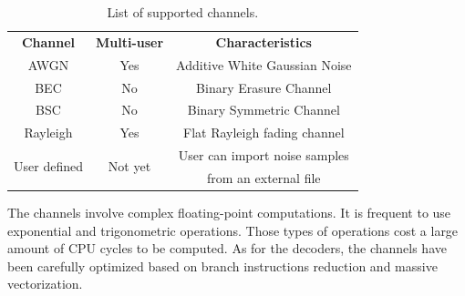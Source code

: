 \begin{table}[htp]
  \centering
  \caption{List of supported channels.}
  \label{tab:lib_channels}
  \begin{tabular}{ c | c | c }
  \multirow{2}{*}{\textbf{Channel}}      & \multirow{2}{*}{\textbf{Multi-user}} & \multirow{2}{*}{\textbf{Characteristics}}      \\
                                         &                                      &                                                \\
  \hline
  \hline
  \multirow{2}{*}{{AWGN}}                & \multirow{2}{*}{Yes}                 & \multirow{2}{*}{Additive White Gaussian Noise} \\
                                         &                                      &                                                \\
  \hline
  \multirow{2}{*}{{BEC}}                 & \multirow{2}{*}{No}                  & \multirow{2}{*}{Binary Erasure Channel}        \\
                                         &                                      &                                                \\
  \hline
  \multirow{2}{*}{{BSC}}                 & \multirow{2}{*}{No}                  & \multirow{2}{*}{Binary Symmetric Channel}      \\
                                         &                                      &                                                \\
  \hline
  \multirow{2}{*}{{Rayleigh}}            & \multirow{2}{*}{Yes}                 & \multirow{2}{*}{Flat Rayleigh fading channel}  \\
                                         &                                      &                                                \\
  \hline
  \multirow{2}{*}{{User defined}}        & \multirow{2}{*}{Not yet}             & User can import noise samples                  \\
                                         &                                      & from an external file                          \\
  \end{tabular}
\end{table}

The channels involve complex floating-point computations. It is frequent to use
exponential and trigonometric operations. Those types of operations cost a large
amount of CPU cycles to be computed. As for the decoders, the channels have been
carefully optimized based on branch instructions reduction and massive
vectorization.

